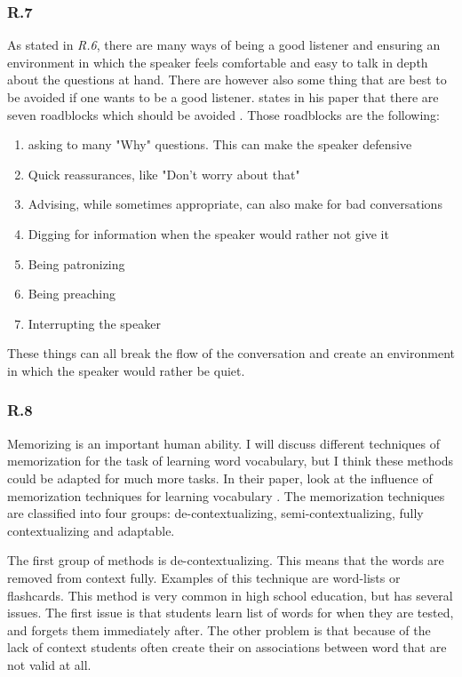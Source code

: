 \documentclass[]{article}
\begin{document}
\subsubsection*{R.7}
As stated in \textit{R.6}, there are many ways of being a good listener and 
ensuring an environment in which the speaker feels comfortable and easy to 
talk in depth about the questions at hand. There are however also some thing that 
are best to be avoided if one wants to be a good listener. \citeauthor[]{beyer1995apprenticing}
states in his paper that there are seven roadblocks which should be avoided \cite{beyer1995apprenticing}.
Those roadblocks are the following:
\begin{enumerate}
    \item asking to many "Why" questions. This can make the speaker defensive
    \item Quick reassurances, like "Don't worry about that"
    \item Advising, while sometimes appropriate, can also make for bad conversations
    \item Digging for information when the speaker would rather not give it
    \item Being patronizing
    \item Being preaching
    \item Interrupting the speaker
\end{enumerate}

These things can all break the flow of the conversation and create an environment
in which the speaker would rather be quiet.

\subsubsection*{R.8}
Memorizing is an important human ability. I will discuss different techniques
of memorization for the task of learning word vocabulary, but I think these 
methods could be adapted for much more tasks.
In their paper, \citeauthor{oxford1990vocabulary} 
look at the influence of memorization techniques for learning vocabulary \cite{oxford1990vocabulary}. 
The memorization techniques are classified into four groups: de-contextualizing, 
semi-contextualizing, fully contextualizing and adaptable.

The first group of methods is de-contextualizing. This means that the words 
are removed from context fully. Examples of this technique are word-lists or 
flashcards. This method is very common in high school education, but has several 
issues. The first issue is that students learn list of words for when they are 
tested, and forgets them immediately after. The other problem is that because of 
the lack of context students often create their on associations between word 
that are not valid at all. 
\end{document}

